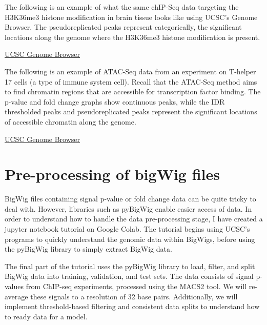 \documentclass[
]{book}
\begin{document}
The following is an example of what the same chIP-Seq data targeting the H3K36me3 histone modification in brain tissue looks like using UCSC's Genome Browser. The pseudoreplicated peaks represent categorically, the significant locations along the genome where the H3K36me3 histone modification is present.

\href{https://genome.ucsc.edu/cgi-bin/hgTracks?db=hg38&lastVirtModeType=default&lastVirtModeExtraState=&virtModeType=default&virtMode=0&nonVirtPosition=&position=chr1\%3A11084744\%2D11095920&hgsid=2307713234_Kap236Tjt6ZGnnNrXMkIhq2Ajn27}{UCSC Genome Browser}

The following is an example of ATAC-Seq data from an experiment on T-helper 17 cells (a type of immune system cell). Recall that the ATAC-Seq method aims to find chromatin regions that are accessible for transcription factor binding. The p-value and fold change graphs show continuous peaks, while the IDR thresholded peaks and pseudoreplicated peaks represent the significant locations of accessible chromatin along the genome.

\href{https://genome.ucsc.edu/cgi-bin/hgTracks?db=hg38&lastVirtModeType=default&lastVirtModeExtraState=&virtModeType=default&virtMode=0&nonVirtPosition=&position=chr1\%3A88379533\%2D113275174&hgsid=2307721306_mcnECXS4Hy0fNQ4yz3ZQTL7nimkW}{UCSC Genome Browser}

\chapter{Pre-processing of bigWig files}\label{pre-processing-of-bigwig-files}

BigWig files containing signal p-value or fold change data can be quite tricky to deal with. However, libraries such as pyBigWig enable easier access of data. In order to understand how to handle the data pre-processing stage, I have created a jupyter notebook tutorial on Google Colab. The tutorial begins using UCSC's programs to quickly understand the genomic data within BigWigs, before using the pyBigWig library to simply extract BigWig data.

The final part of the tutorial uses the pyBigWig library to load, filter, and split BigWig data into training, validation, and test sets. The data consists of signal p-values from ChIP-seq experiments, processed using the MACS2 tool. We will re-average these signals to a resolution of 32 base pairs. Additionally, we will implement threshold-based filtering and consistent data splits to understand how to ready data for a model.
\end{document}
